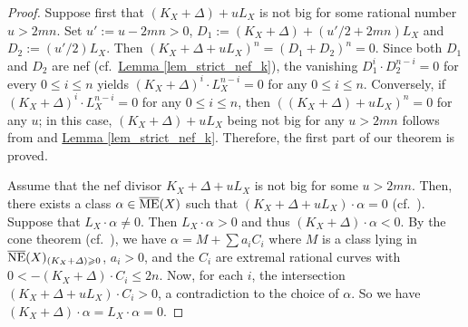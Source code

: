 \begin{proof}
Suppose first that $(K_X+\Delta)+uL_X$ is not big for some rational number $u>2mn$. 
Set $u':=u-2mn>0$, $D_1:=(K_X+\Delta)+(u'/2+2mn)L_X$ and $D_2:=(u'/2)L_X$.	
Then $(K_X+\Delta+uL_X)^n=(D_1+D_2)^n=0$.
Since both $D_1$ and $D_2$ are nef (cf.~{\hyperref[lem_strict_nef_k]{Lemma  \ref*{lem_strict_nef_k}}}), the vanishing $D_1^i\cdot D_2^{n-i}=0$ for every $0\leqslant i\leqslant n$  yields $(K_X+\Delta)^i\cdot L_X^{n-i}=0$ for any $0\leqslant i\leqslant n$. 
Conversely, if $(K_X+\Delta)^i\cdot L_X^{n-i}=0$ for any $0\leqslant i\leqslant n$, then $((K_X+\Delta)+uL_X)^n=0$ for any $u$; in this case, $(K_X+\Delta)+uL_X$ being not big for any $u>2mn$ follows from \cite[Proposition 2.61, p.~68]{KM98} and {\hyperref[lem_strict_nef_k]{Lemma  \ref*{lem_strict_nef_k}}}. 
Therefore, the first part of our theorem is proved.

Assume that the nef divisor $K_X+\Delta+uL_X$ is not big for some $u>2mn$. 
Then, there exists a class $\alpha\in\overline{\textup{ME}}(X)$ such that $(K_X+\Delta+uL_X)\cdot\alpha=0$ (cf.~\cite[Theorem 2.2 and the remarks therein]{BDPP13}). 
Suppose that $L_X\cdot\alpha\neq 0$.  
Then $L_X\cdot\alpha>0$ and thus $(K_X+\Delta)\cdot\alpha<0$.
By the cone theorem (cf.~\cite[Theorem 3.7, p.~76]{KM98}), we have 
$\alpha=M+\sum a_iC_i$ 
where $M$ is a class lying in $\overline{\textup{NE}}(X)_{(K_X+\Delta)\geqslant 0}$, $a_i>0$, and the $C_i$ are extremal rational curves with $0<-(K_X+\Delta)\cdot C_i\leqslant 2n$.
Now, for each $i$, the intersection $(K_X+\Delta+uL_X)\cdot C_i>0$, a contradiction to the choice of $\alpha$.
So we have $(K_X+\Delta)\cdot \alpha=L_X\cdot\alpha=0$.
\end{proof}




